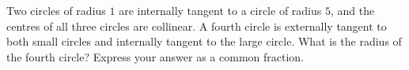Two circles of radius $1$ are internally tangent to a circle of radius $5$, and the centres of all three circles are collinear. A fourth circle is externally tangent to both small circles and internally tangent to the large circle. What is the radius of the fourth circle? Express your answer as a common fraction.
